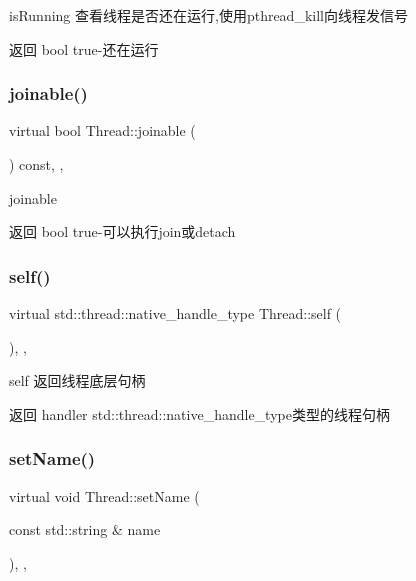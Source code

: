 is\+Running 查看线程是否还在运行,使用pthread\+\_\+kill向线程发信号 

\begin{DoxyReturn}{返回}
bool true-\/还在运行 
\end{DoxyReturn}
\mbox{\label{classThread_a86d1c278c0b9fea63037c437a909064f}} 
\subsubsection{\texorpdfstring{joinable()}{joinable()}}
{\footnotesize\ttfamily virtual bool Thread\+::joinable (\begin{DoxyParamCaption}{ }\end{DoxyParamCaption}) const\hspace{0.3cm}{\ttfamily [inline]}, {\ttfamily [final]}, {\ttfamily [virtual]}}



joinable 

\begin{DoxyReturn}{返回}
bool true-\/可以执行join或detach 
\end{DoxyReturn}
\mbox{\label{classThread_a554185abbfacbcc4bf2e953cdddcbbba}} 
\subsubsection{\texorpdfstring{self()}{self()}}
{\footnotesize\ttfamily virtual std\+::thread\+::native\+\_\+handle\+\_\+type Thread\+::self (\begin{DoxyParamCaption}{ }\end{DoxyParamCaption})\hspace{0.3cm}{\ttfamily [inline]}, {\ttfamily [final]}, {\ttfamily [virtual]}}



self 返回线程底层句柄 

\begin{DoxyReturn}{返回}
handler std\+::thread\+::native\+\_\+handle\+\_\+type类型的线程句柄 
\end{DoxyReturn}
\mbox{\label{classThread_ae816904b2a3e248472813e17c2b12a71}} 
\subsubsection{\texorpdfstring{set\+Name()}{setName()}}
{\footnotesize\ttfamily virtual void Thread\+::set\+Name (\begin{DoxyParamCaption}\item[{const std\+::string \&}]{name }\end{DoxyParamCaption})\hspace{0.3cm}{\ttfamily [inline]}, {\ttfamily [final]}, {\ttfamily [virtual]}}



